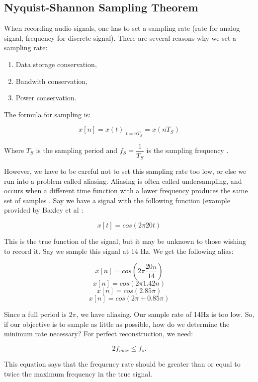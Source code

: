 \subsection{Nyquist-Shannon Sampling Theorem}
When recording audio signals, one has to set a sampling rate (rate for analog signal, frequency for discrete signal). There are several reasons why we set a sampling rate:
\begin{enumerate}
	\item Data storage conservation,
	\item Bandwith conservation,
	\item Power conservation.
\end{enumerate}

The formula for sampling is:

\begin{equation}
x[n]=x(t)|_{t=nT_{S}}=x(nT_{S})
\end{equation}

Where \(T_{S}\) is the sampling period and \(f_{S}= \dfrac{1}{T_{S}}\) is the sampling frequency \cite{notes:class}.

However, we have to be careful not to set this sampling rate too low, or else we run into a problem called aliasing.  Aliasing is often called undersampling, and occurs when a different time function with a lower frequency produces the same set of samples \cite{aliase:wiki}. Say we have a signal with the following function (example provided by Baxley et al \cite{notes:class}:

\begin{equation}
x[t]=cos(2\pi20t)
\end{equation}

This is the true function of the signal, but it may be unknown to those wishing to record it.  Say we sample this signal at 14 Hz.  We get the following alias:

\begin{equation}
x[n]=cos(2\pi\dfrac{20n}{14})
\end{equation}
\begin{equation}
x[n]=cos(2\pi1.42n)
\end{equation}
\begin{equation}
x[n]=cos(2.85\pi)
\end{equation}
\begin{equation}
x[n]=cos(2\pi+0.85\pi)
\end{equation}

Since a full period is \(2\pi\), we have aliasing.  Our sample rate of 14Hz is too low. So, if our objective is to sample as little as possible, how do we determine the minimum rate necessary?  For perfect reconstruction, we need:

\begin{equation}
2f_{max}\leq f_{s}.
\end{equation}

This equation says that the frequency rate should be greater than or equal to twice the maximum frequency in the true signal.
